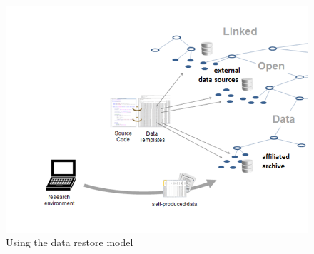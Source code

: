 \documentclass{acm_proc_article-sp}
\begin{document}


\begin{figure}[htb]
\centering
\includegraphics[width=.48\textwidth]{img/fig-model-processing.png}
\caption{
Using the data restore model
}
\label{fig:modelprocessing}
\end{figure}






























\end{document}
